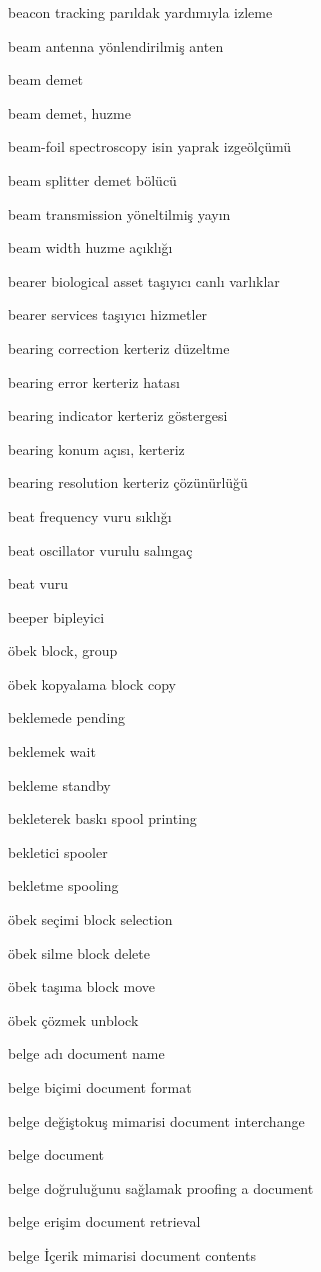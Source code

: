 \documentclass[12pt,fleqn]{article}\usepackage{../../common}
\begin{document}
beacon tracking parıldak yardımıyla izleme

beam antenna yönlendirilmiş anten

beam demet

beam demet, huzme

beam-foil spectroscopy isin yaprak izgeölçümü

beam splitter demet bölücü

beam transmission yöneltilmiş yayın

beam width huzme açıklığı

bearer biological asset taşıyıcı canlı varlıklar

bearer services taşıyıcı hizmetler

bearing correction kerteriz düzeltme

bearing error kerteriz hatası

bearing indicator kerteriz göstergesi

bearing konum açısı, kerteriz

bearing resolution kerteriz çözünürlüğü

beat frequency vuru sıklığı

beat oscillator vurulu salıngaç

beat vuru

beeper bipleyici

öbek block, group

öbek kopyalama block copy

beklemede pending

beklemek wait

bekleme standby

bekleterek baskı spool printing

bekletici spooler

bekletme spooling

öbek seçimi block selection

öbek silme block delete

öbek taşıma block move

öbek çözmek unblock

belge adı document name

belge biçimi document format

belge değiştokuş mimarisi document interchange

belge document

belge doğruluğunu sağlamak proofing a document

belge erişim document retrieval

belge İçerik mimarisi document contents
\end{document}
